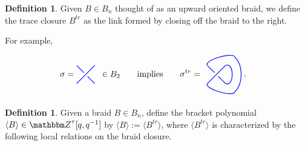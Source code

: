 \documentclass{amsart}
\newcommand{\hackcenter}[1]{
 \xy (0,0)*{#1}; \endxy}
\theoremstyle{plain}
\theoremstyle{definition}
\newtheorem{definition}[theorem]{Definition}
\theoremstyle{definition}
\numberwithin{equation}{section}
\numberwithin{theorem}{section}
\numberwithin{equation}{section}
\def\Z{{\mathbbm Z}}
\begin{document}
\begin{definition}
  Given $B\in B_n$ thought of as an upward oriented braid, we define the trace closure $B^{tr}$ as the link formed by closing off the braid to the right. 
\end{definition}
For example, 
\begin{align*}
  \sigma =  \hackcenter{ \begin{tikzpicture} [scale=.75]
\draw[thick,   blue, -] (0,0) to (1,1);
\draw[thick,   blue  ] (1,0) to (.6,.4);
\draw[thick,   blue, -] (0,1) to (.4,.6);
\end{tikzpicture}} \;\; \in B_2& \qquad \text{implies}\qquad
\sigma^{tr}=
  \hackcenter{\begin{tikzpicture} [scale=.75]
\draw[thick,   blue] (0,0) to (1,1);
\draw[thick,   blue] (1,0) to (.6,.4);
\draw[thick,   blue] (0,1) to (.4,.6);
\draw[thick, blue] (1,1) .. controls ++(.5,.25) and ++(.5, -.25) ..(1,0);
\draw[thick, blue] (0,1) .. controls ++(-.25,.25) and ++(-.2, .25) ..(1.5,1.5);
\draw[thick, blue] (0,0) .. controls ++(-.25,-.25) and ++(-.2, -.25) ..(1.5,-0.5);
\draw[thick, blue] (1.5,1.5) .. controls++ (0.5,-0.5) and ++(0.5,0.5) ..(1.5,-0.5);
\end{tikzpicture}}.
\end{align*}

\begin{definition}
  Given a braid $B\in B_n$, define the bracket polynomial $\langle B \rangle\in \Z^\tau[q,q^{-1}]$ by $\langle B \rangle := \langle B^{tr} \rangle$, where $\langle B^{tr} \rangle$ is characterized by the following local relations on the braid closure.
\end{definition}
\end{document}
